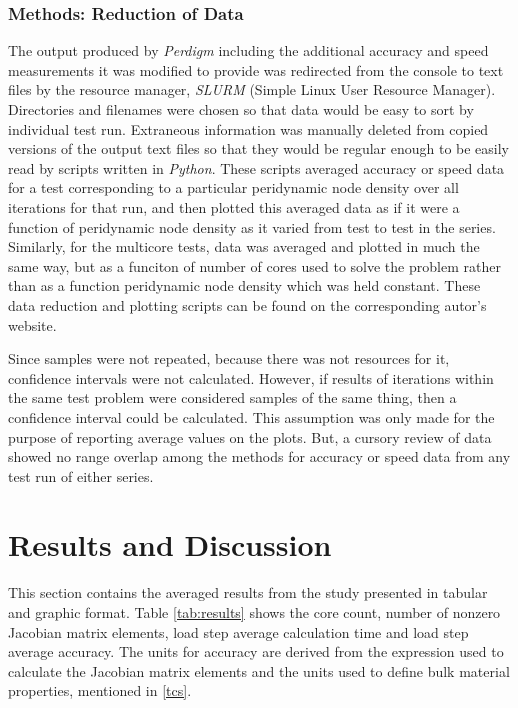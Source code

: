 \documentclass[preprint,12pt]{elsarticle}
\begin{document}
\subsubsection{Methods: Reduction of Data} The output produced by \emph{Perdigm} including the
additional accuracy and speed measurements it was modified to provide was redirected from the
console to text files by the resource manager, \emph{SLURM} (Simple Linux User Resource Manager).
Directories and filenames were chosen so that data would be easy to sort by individual test run.
Extraneous information was manually deleted from copied versions of the output text files so that
they would be regular enough to be easily read by scripts written in \emph{Python}. These scripts
averaged accuracy or speed data for a test corresponding to a particular peridynamic node density
over all iterations for that run, and then plotted this averaged data as if it were a function of
peridynamic node density as it varied from test to test in the series.  Similarly, for the multicore
tests, data was averaged and plotted in much the same way, but as a funciton of number of cores used
to solve the problem rather than as a function peridynamic node density which was held constant.
These data reduction and plotting scripts can be found on the corresponding autor's website.

Since samples were not repeated, because there was not resources for it, confidence intervals were
not calculated. However, if results of iterations within the same test problem were considered
samples of the same thing, then a confidence interval could be calculated. This assumption was only made
for the purpose of reporting average values on the plots. But, a cursory review of data showed no 
range overlap among the methods for accuracy or speed data from any test run of either series.

\section{Results and Discussion}

This section contains the averaged results from the study presented in tabular and graphic format.
Table \ref{tab:results} shows the core count, number of nonzero Jacobian matrix elements, load step
average calculation time and load step average accuracy. The units for accuracy are derived from the
expression used to calculate the Jacobian matrix elements and the units used to define bulk material
properties, mentioned in \ref{tcs}.
\end{document}
